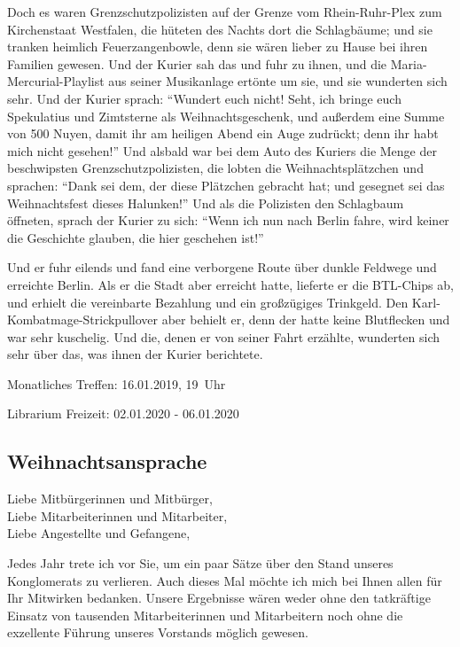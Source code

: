 Doch es waren Grenzschutzpolizisten auf der Grenze vom Rhein-Ruhr-Plex zum Kirchenstaat Westfalen, die hüteten des Nachts dort die Schlagbäume; und sie tranken heimlich Feuerzangenbowle, denn sie wären lieber zu Hause bei ihren Familien gewesen.
Und der Kurier sah das und fuhr zu ihnen, und die Maria-Mercurial-Playlist aus seiner Musikanlage ertönte um sie, und sie wunderten sich sehr.
Und der Kurier sprach: \enquote{Wundert euch nicht! Seht, ich bringe euch Spekulatius und Zimtsterne als Weihnachtsgeschenk, und außerdem eine Summe von 500 Nuyen, damit ihr am heiligen Abend ein Auge zudrückt; denn ihr habt mich nicht gesehen!}
Und alsbald war bei dem Auto des Kuriers die Menge der beschwipsten Grenzschutzpolizisten, die lobten die Weihnachtsplätzchen und sprachen:
\enquote{Dank sei dem, der diese Plätzchen gebracht hat; und gesegnet sei das Weihnachtsfest dieses Halunken!}
Und als die Polizisten den Schlagbaum öffneten, sprach der Kurier zu sich:
\enquote{Wenn ich nun nach Berlin fahre, wird keiner die Geschichte glauben, die hier geschehen ist!}

Und er fuhr eilends und fand eine verborgene Route über dunkle Feldwege und erreichte Berlin.
Als er die Stadt aber erreicht hatte, lieferte er die BTL-Chips ab, und erhielt die vereinbarte Bezahlung und ein großzügiges Trinkgeld.
Den Karl-Kombatmage-Strickpullover aber behielt er, denn der hatte keine Blutflecken und war sehr kuschelig.
Und die, denen er von seiner Fahrt erzählte, wunderten sich sehr über das, was ihnen der Kurier berichtete.

\begin{termineOhneImpressum}
  \item Monatliches Treffen: 16.01.2019, 19~Uhr
  \item Librarium Freizeit: 02.01.2020 - 06.01.2020
\end{termineOhneImpressum}

\subsection{Weihnachtsansprache }
Liebe Mitbürgerinnen und Mitbürger,\\
Liebe Mitarbeiterinnen und Mitarbeiter,\\
Liebe Angestellte und Gefangene,

Jedes Jahr trete ich vor Sie, um ein paar Sätze über den Stand unseres
Konglomerats zu verlieren. Auch dieses Mal möchte ich mich bei Ihnen
allen für Ihr Mitwirken bedanken. Unsere Ergebnisse wären weder ohne den
tatkräftige Einsatz von tausenden Mitarbeiterinnen und Mitarbeitern noch
ohne die exzellente Führung unseres Vorstands möglich gewesen.

